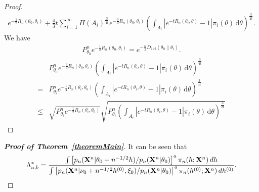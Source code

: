 \documentclass[11pt]{article}
\theoremstyle{plain}
\theoremstyle{definition}
\theoremstyle{remark}
\begin{document}
\begin{appendices}
\begin{proof}
\begin{align*}
e^{-\frac 1 2 R_n (\theta_0 , \theta_i)}
+
        \frac 4 3
        t
        \sum_{i=1}^\infty
        \Pi(A_i)^{\frac{3}{ 4 t }}
e^{- \frac 3 4 R_n (\theta_0 , \theta_i)}
\left( 
        \int_{
            A_i
        }
        |e^{-t R_n (\theta_i, \theta)} -1| \pi_i(\theta) \, \mathrm d \theta
    \right)^{\frac{3}{ 4 t }}.
    \end{align*}
    We have
    \begin{align*}
        P_{\theta_0}^n 
e^{-\frac 1 2 R_n (\theta_0 , \theta_i)}
= e^{ -\frac n 2 D_{1/2} (\theta_0 \| \theta_i)}.
    \end{align*}
    \begin{align*}
        &
        P_{\theta_0}^n 
e^{- \frac 3 4 R_n (\theta_0 , \theta_i)}
\left( 
        \int_{
            A_i
        }
        |e^{-t R_n (\theta_i, \theta)} -1| \pi_i(\theta) \, \mathrm d \theta
    \right)^{\frac{3}{ 4 t }}
    \\
    =&
    P_{\theta_i}^n e^{-\frac 1 4 R_n(\theta_i, \theta_0)} 
\left( 
        \int_{
            A_i
        }
        |e^{-t R_n (\theta_i, \theta)} -1| \pi_i(\theta) \, \mathrm d \theta
    \right)^{\frac{3}{ 4 t }}
    \\
    \leq &
    \sqrt{
    P_{\theta_i}^n 
    e^{-\frac 1 2 R_n(\theta_i, \theta_0)} 
}
    \sqrt{
P_{\theta_i}^n
\left( 
        \int_{
            A_i
        }
        |e^{-t R_n (\theta_i, \theta)} -1| \pi_i(\theta) \, \mathrm d \theta
    \right)^{\frac{3}{ 2 t }}
}
    \end{align*}
\end{proof}








\begin{proof}[\textbf{Proof of Theorem~\ref{theoremMain}}]
    It can be seen that
    \begin{equation*}
        \Lambda_{a,b}^*=\frac{
    \int \left[{p_n(\mathbf{X}^{n}|\theta_0+n^{-1/2}h)}/{p_n(\mathbf{X}^{n}|\theta_0)}\right]^a \pi_n (h;\mathbf{X}^{n}) \, dh
        }{
    \int \left[ {p_n(\mathbf{X}^{n}|\nu_0+n^{-1/2}h^{(0)},\xi_0)}/{p_n(\mathbf{X}^{n}|\theta_0)}\right]^a \pi_n (h^{(0)};\mathbf{X}^{n}) \, dh^{(0)}
}.
    \end{equation*}



\end{proof}
\end{appendices}
\end{document}
